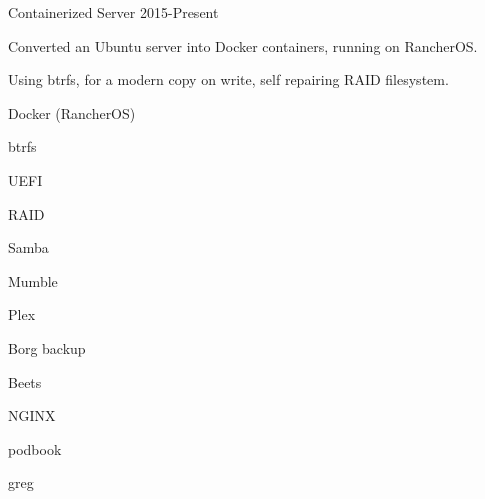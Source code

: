 

\begin{cventries}

  \cventry
    {} %
    {Containerized Server} %
    {} %
    {2015-Present} %
    {%
      \begin{cvitems} %
        \item {Converted an Ubuntu server into Docker containers, running on RancherOS.}
        \item {Using btrfs, for a modern copy on write, self repairing RAID filesystem.}
      \end{cvitems}
    }
    \begin{cventryskills}
      \item Docker (RancherOS)
      \item btrfs
      \item UEFI
      \item RAID
      \item Samba
      \item Mumble
      \item Plex
      \item Borg backup
      \item Beets
      \item NGINX
      \item podbook
      \item greg
    \end{cventryskills}

\end{cventries}
